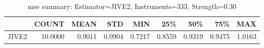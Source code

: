 \begin{table}[ht]
\centering
\caption{mse summary: Estimator=JIVE2, Instruments=333, Strength=0.30}
\begin{tabular}{lrrrrrrrr}
\toprule
 & COUNT & MEAN & STD & MIN & 25\% & 50\% & 75\% & MAX \\
\midrule
JIVE2 & 10.0000 & 0.9011 & 0.0904 & 0.7217 & 0.8559 & 0.9319 & 0.9475 & 1.0163 \\
\bottomrule
\end{tabular}
\end{table}
